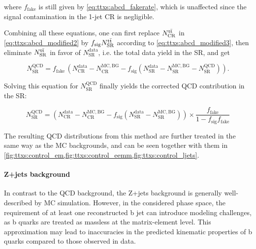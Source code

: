 \noindent where $f_{\mathrm{fake}}$ is still given by \cref{eq:ttxs:abcd_fakerate}, which is unaffected since the \ttbar signal contamination in the 1-jet CR is negligible.

Combining all these equations, one can first replace $N^{\mathrm{t \bar{t}}}_{\mathrm{CR}}$ in \cref{eq:ttxs:abcd_modified2} by $f_{\mathrm{sig}} N^{\mathrm{t \bar{t}}}_{\mathrm{SR}}$ according to \cref{eq:ttxs:abcd_modified3}, then eliminate $N^{\mathrm{t \bar{t}}}_{\mathrm{SR}}$ in favor of $N^{\mathrm{data}}_{\mathrm{SR}}$, i.e. the total data yield in the SR, and get

\begin{equation}
    N^{\mathrm{QCD}}_{\mathrm{SR}} = f_{\mathrm{fake}} \, \left( N^{\mathrm{data}}_{\mathrm{CR}} - N^{\mathrm{MC,BG}}_{\mathrm{CR}} - f_{\mathrm{sig}} \left( N^{\mathrm{data}}_{\mathrm{SR}} - N^{\mathrm{MC,BG}}_{\mathrm{SR}} - N^{\mathrm{QCD}}_{\mathrm{SR}} \right) \right) .
\end{equation}

Solving this equation for $N^{\mathrm{QCD}}_{\mathrm{SR}}$ finally yields the corrected QCD contribution in the SR:

\begin{equation}
\label{eq:ttxs:abcd_modified}
    N^{\mathrm{QCD}}_{\mathrm{SR}} = \left( N^{\mathrm{data}}_{\mathrm{CR}} - N^{\mathrm{MC,BG}}_{\mathrm{CR}} - f_{\mathrm{sig}} ( N^{\mathrm{data}}_{\mathrm{SR}} - N^{\mathrm{MC,BG}}_{\mathrm{SR}} )\right)
    \times \frac{ f_{\mathrm{fake}} } {1 - f_{\mathrm{sig}} f_{\mathrm{fake}}}
\end{equation}

The resulting QCD distributions from this method are further treated in the same way as the MC backgrounds, and can be seen together with them in \cref{fig:ttxs:control_em,fig:ttxs:control_eemm,fig:ttxs:control_ljets}.
  

\paragraph{Z+jets background}

In contrast to the QCD background, the Z+jets background is generally well-described by MC simulation. 
However, in the considered phase space, the requirement of at least one reconstructed b jet can introduce modeling challenges, as b quarks are treated as massless at the matrix-element level. This approximation may lead to inaccuracies in the predicted kinematic properties of b quarks compared to those observed in data.

